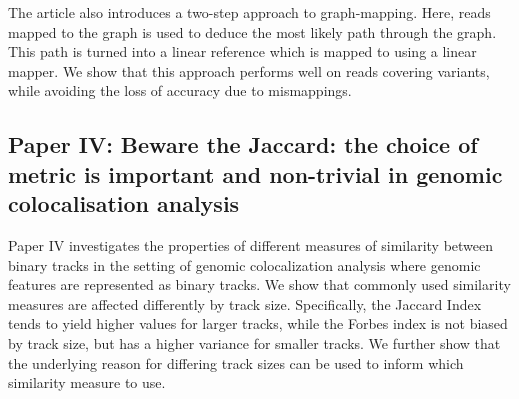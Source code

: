 The article also introduces a two-step approach to graph-mapping.
Here, reads mapped to the graph is used to deduce the most likely path through the graph.
This path is turned into a linear reference which is mapped to using a linear mapper.
We show that this approach performs well on reads covering variants, while avoiding the loss of accuracy due to mismappings.

\subsection*{Paper IV: Beware the Jaccard: the choice of metric is important and non-trivial in genomic colocalisation analysis}
Paper IV investigates the properties of different measures of similarity between binary tracks in the setting of genomic colocalization analysis where genomic features are represented as binary tracks.
We show that commonly used similarity measures are affected differently by track size.
Specifically, the Jaccard Index tends to yield higher values for larger tracks, while the Forbes index is not biased by track size, but has a higher variance for smaller tracks. We further show that the underlying reason for differing track sizes can be used to inform which similarity measure to use.

